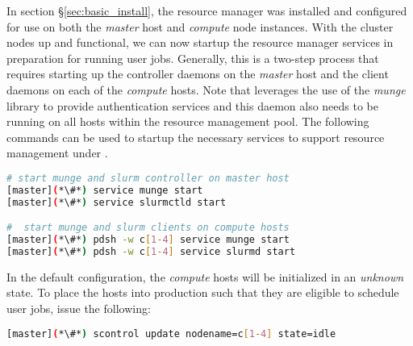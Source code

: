In section \S\ref{sec:basic_install}, the \SLURM{} resource manager was installed
and configured for use on both the {\em master} host and {\em compute} node
instances. With the cluster nodes up and functional, we can now startup the
resource manager services in preparation for running user jobs. Generally, this
is a two-step process that requires starting up the controller daemons on the {\em
  master} host and the client daemons on each of the {\em compute} hosts.  
Note that \SLURM{} leverages the use of the {\em munge} library to provide
authentication services and this daemon also needs to be running on all hosts
within the resource management pool. 
The following commands can be used to startup the necessary services to support
resource management under \SLURM{}.

\vspace*{0.3cm}

\begin{lstlisting}[language=bash]
# start munge and slurm controller on master host
[master](*\#*) service munge start
[master](*\#*) service slurmctld start

#  start munge and slurm clients on compute hosts
[master](*\#*) pdsh -w c[1-4] service munge start
[master](*\#*) pdsh -w c[1-4] service slurmd start
\end{lstlisting}

In the default configuration, the {\em compute} hosts will be initialized in an
{\em unknown} state. To place the hosts into production such that they are
eligible to schedule user jobs, issue the following:

\begin{lstlisting}[language=bash]
[master](*\#*) scontrol update nodename=c[1-4] state=idle
\end{lstlisting}



